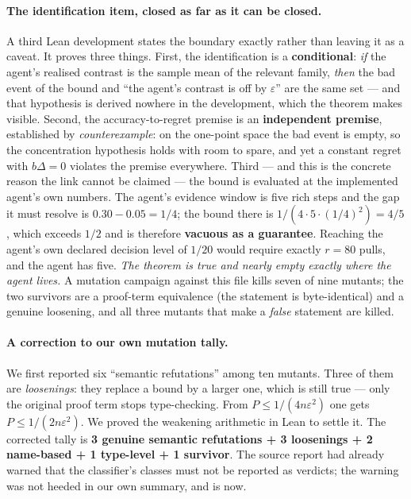 \documentclass[11pt]{article}
\begin{document}
\paragraph{The identification item, closed as far as it can be closed.} A third Lean
development states the boundary exactly rather than leaving it as a caveat. It proves
three things. First, the identification is a \textbf{conditional}: \emph{if} the
agent's realised contrast is the sample mean of the relevant family, \emph{then} the
bad event of the bound and ``the agent's contrast is off by $\varepsilon$'' are the
same set --- and that hypothesis is derived nowhere in the development, which the
theorem makes visible. Second, the accuracy-to-regret premise is an \textbf{independent
premise}, established by \emph{counterexample}: on the one-point space the bad event is
empty, so the concentration hypothesis holds with room to spare, and yet a constant
regret with $b\Delta = 0$ violates the premise everywhere. Third --- and this is the
concrete reason the link cannot be claimed --- the bound is evaluated at the
implemented agent's own numbers. The agent's evidence window is five rich steps and
the gap it must resolve is $0.30 - 0.05 = 1/4$; the bound there is
$1/(4 \cdot 5 \cdot (1/4)^2) = 4/5$, which exceeds $1/2$ and is therefore
\textbf{vacuous as a guarantee}. Reaching the agent's own declared decision level of
$1/20$ would require exactly $r = 80$ pulls, and the agent has five. \emph{The theorem
is true and nearly empty exactly where the agent lives.} A mutation campaign against
this file kills seven of nine mutants; the two survivors are a proof-term equivalence
(the statement is byte-identical) and a genuine loosening, and all three mutants that
make a \emph{false} statement are killed.

\paragraph{A correction to our own mutation tally.} We first reported six
``semantic refutations'' among ten mutants. Three of them are \emph{loosenings}: they
replace a bound by a larger one, which is still true --- only the original proof term
stops type-checking. From $P \le 1/(4n\varepsilon^{2})$ one gets
$P \le 1/(2n\varepsilon^{2})$. We proved the weakening arithmetic in Lean to settle it.
The corrected tally is \textbf{3 genuine semantic refutations + 3 loosenings + 2
name-based + 1 type-level + 1 survivor}. The source report had already warned that the
classifier's classes must not be reported as verdicts; the warning was not heeded in
our own summary, and is now.
\end{document}
